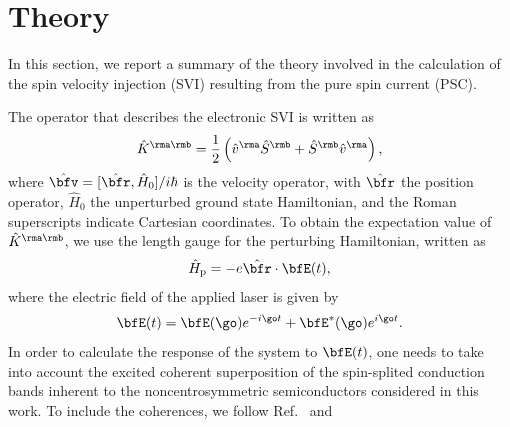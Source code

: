 \documentclass[prb,11pt,tightenlines,twocolumn,aps]{revtex4-1}
\begin{document}
\section{Theory} %
\label{sec:theory}




In this section, we report a summary of the theory  involved in the
calculation of the spin velocity
injection (SVI) resulting from the
pure spin current (PSC).
 
The operator that describes the electronic SVI is written as
\begin{align}\label{z.1}
\hat K^{\rma\rmb}=\frac{1}{2}\left( \hat v^\rma \hat S^\rmb 
+\hat  S^\rmb \hat v^\rma\right) 
,
\end{align} 
where $\hat\bfv=[\hat\bfr,\hat H_0]/i\hbar$ is the velocity operator, with
$\hat \bfr$ the position operator,  $\hat H_0$ the unperturbed
ground state Hamiltonian, and
the Roman superscripts  indicate Cartesian coordinates. 
To obtain the expectation value of 
$\hat K^{\rma\rmb}$, we use the length gauge for the perturbing
Hamiltonian, written as
\begin{align}\label{z.2}
\hat H_{\text{p}}=-e\hat\bfr\cdot\bfE(t)
,
\end{align}   
where the electric field of the applied laser is given by
\begin{align}\label{z.3}
\bfE(t)= \bfE(\go)e^{-i\go t} + \bfE^*(\go)e^{i\go t}
.
\end{align}
In order to 
calculate the response of the system to $\bfE(t)$, one needs to
take into account the excited coherent superposition
of the spin-splited conduction bands inherent to the 
noncentrosymmetric 
semiconductors considered in this work.
To include the coherences, we follow Ref.~ and
\end{document}

